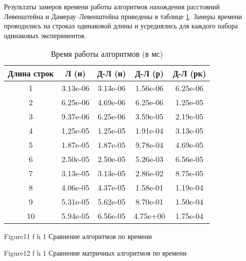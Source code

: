 Результаты замеров времени работы алгоритмов нахождения расстояний
Левенштейна и Дамерау–Левенштейна приведены в таблице \ref{tbl:time_measurements}. Замеры времени проводились на строках одинаковой длины и усреднялись для каждого набора одинаковых экспериментов.

\begin{table}[h]
	\begin{center}
		\begin{threeparttable}
			\captionsetup{justification=raggedright,singlelinecheck=off}
			\caption{Время работы алгоритмов (в мс)}
			\label{tbl:time_measurements}
			\begin{tabular}{|c|c|c|c|c|}
				\hline
				Длина строк &  Л (и)  & Д-Л (и) & Д-Л (р) & Д-Л (рк) \\
				\hline
				1 & 3.13e-06 & 3.13e-06 & 1.56e-06 & 6.25e-06\\
				\hline
				2 & 6.25e-06 & 4.69e-06 & 6.25e-06 & 1.25e-05\\
				\hline
				3 & 9.37e-06 & 6.25e-06 & 3.59e-05 & 2.19e-05\\
				\hline
				4 & 1.25e-05 & 1.25e-05 & 1.91e-04 & 3.13e-05\\
				\hline
				5 & 1.87e-05 & 1.87e-05 & 9.78e-04 & 4.69e-05\\
				\hline
				6 & 2.50e-05 & 2.50e-05 & 5.26e-03 & 6.56e-05\\
				\hline
				7 & 3.13e-05 & 3.13e-05 & 2.86e-02 & 8.75e-05\\
				\hline
				8 & 4.06e-05 & 4.37e-05 & 1.58e-01 & 1.19e-04\\
				\hline
				9 & 5.31e-05 & 5.62e-05 & 8.70e-01 & 1.50e-04\\
				\hline
				10 & 5.94e-05 & 6.56e-05 & 4.75e+00 & 1.75e-04\\
				\hline
				
				
			\end{tabular}
		\end{threeparttable}
	\end{center}
\end{table}

{Figure11} %
{f} %
{h} %
{1\textwidth} %
{Сравнение алгоритмов по времени} %

{Figure12} %
{f} %
{h} %
{1\textwidth} %
{Сравнение матричных алгоритмов по времени} %

